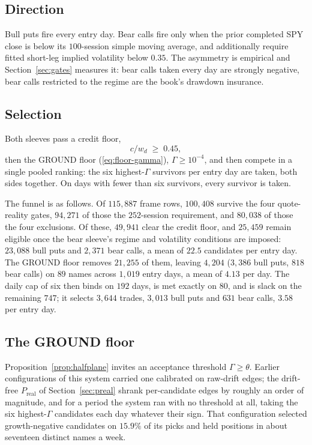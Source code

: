 \documentclass[11pt]{article}
\newcommand{\Preal}{P_{\mathrm{real}}}
\begin{document}
\subsection{Direction}

Bull puts fire every entry day. Bear calls fire only when the prior completed
SPY close is below its $100$-session simple moving average, and additionally
require fitted short-leg implied volatility below $0.35$. The asymmetry is
empirical and Section~\ref{sec:gates} measures it: bear calls taken every day
are strongly negative, bear calls restricted to the regime are the book's
drawdown insurance.

\subsection{Selection}
\label{sec:selection}

Both sleeves pass a credit floor,
\begin{equation}
c / w_d \;\geq\; 0.45 ,
\label{eq:floor}
\end{equation}
then the GROUND floor (\ref{eq:floor-gamma}), $\Gamma \geq 10^{-4}$, and then
compete in a single pooled ranking: the six highest-$\Gamma$ survivors per
entry day are taken, both sides together. On days with fewer than six
survivors, every survivor is taken.

The funnel is as follows. Of $115{,}887$ frame rows, $100{,}408$ survive the
four quote-reality gates, $94{,}271$ of those the $252$-session requirement,
and $80{,}038$ of those the four exclusions. Of these, $49{,}941$ clear the
credit floor, and $25{,}459$ remain eligible once the bear sleeve's regime and
volatility conditions are imposed: $23{,}088$ bull puts and $2{,}371$ bear
calls, a mean of $22.5$ candidates per entry day. The GROUND floor removes
$21{,}255$ of them, leaving $4{,}204$ ($3{,}386$ bull puts, $818$ bear calls)
on $89$ names across $1{,}019$ entry days, a mean of $4.13$ per day. The daily
cap of six then binds on $192$ days, is met exactly on $80$, and is slack on
the remaining $747$; it selects $3{,}644$ trades, $3{,}013$ bull puts and
$631$ bear calls, $3.58$ per entry day.

\subsection{The GROUND floor}
\label{sec:floor}

Proposition~\ref{prop:halfplane} invites an acceptance threshold
$\Gamma \geq \theta$. Earlier configurations of this system carried one
calibrated on raw-drift edges; the drift-free $\Preal$ of
Section~\ref{sec:preal} shrank per-candidate edges by roughly an order of
magnitude, and for a period the system ran with no threshold at all, taking
the six highest-$\Gamma$ candidates each day whatever their sign. That
configuration selected growth-negative candidates on $15.9\%$ of its picks and
held positions in about seventeen distinct names a week.
\end{document}
